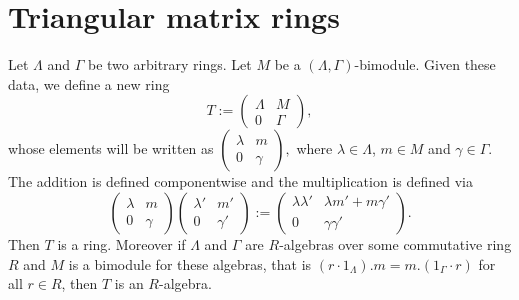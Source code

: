 %




\section{Triangular matrix rings}


Let $\Lambda$ and $\Gamma$ be two arbitrary rings. Let $M$ be a $(\Lambda,\Gamma)$-bimodule. Given these data, we define a new ring
\[
T :=
\begin{pmatrix}
\Lambda & M\\
0 & \Gamma
\end{pmatrix},
\]
whose elements will be written as
$
\left(
\begin{smallmatrix}
\lambda & m\\
0 & \gamma
\end{smallmatrix}
\right),
$
where $\lambda\in\Lambda$, $m\in M$ and $\gamma\in\Gamma$. The addition is defined componentwise and the multiplication is defined via
\[
\begin{pmatrix}
\lambda & m\\
0 & \gamma
\end{pmatrix}
\begin{pmatrix}
\lambda' & m'\\
0 & \gamma'
\end{pmatrix}
:=
\begin{pmatrix}
\lambda\lambda' & \lambda m' + m \gamma'\\
0 & \gamma\gamma'
\end{pmatrix}.
\]
%
Then $T$ is a ring. Moreover if $\Lambda$ and $\Gamma$ are $R$-algebras over some commutative ring $R$ and $M$ is a bimodule for these algebras, that is $(r\cdot 1_\Lambda).m=m.(1_\Gamma \cdot r)$ for all $r\in R$, then $T$ is an $R$-algebra.


